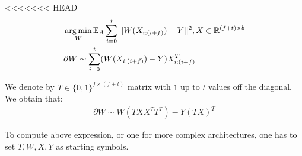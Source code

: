 <<<<<<< HEAD
=======
\begin{align*}
& \operatorname*{arg\,min}_{W} \mathbb{E}_A \sum_{i = 0}^t||W(X_{i : (i + f)}) - Y||^2, X \in \mathbb{R}^{(f + t) \times b}\\
& \partial W \sim \sum_{i = 0}^t(W(X_{i : (i + f)}) - Y) X_{i : (i + f)}^T
\end{align*}

We denote by $T \in \{0, 1\}^{f \times (f + t)}$ matrix with $1$ up to $t$ values off the diagonal.
We obtain that:
\begin{align*}
\partial W \sim W(TXX^TT^T) - Y(TX)^T 
\end{align*}

To compute above expression, or one for more complex architectures, one
has to set $T, W, X, Y$ as starting symbols.

